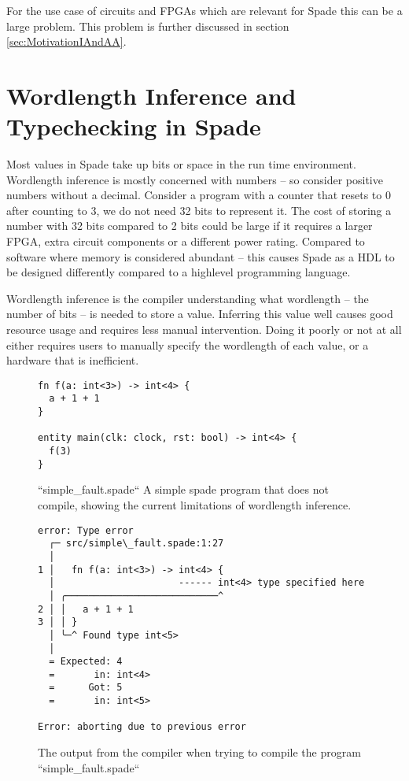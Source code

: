 For the use case of circuits and FPGAs which are relevant for Spade this can be a large problem. This problem is further discussed in section \ref{sec:MotivationIAndAA}.


\cite{src:affAri}

\section{Wordlength Inference and Typechecking in Spade}
\label{sec:TheProblem}
Most values in Spade take up bits or space in the run time environment. Wordlength inference is mostly concerned with numbers -- so consider positive numbers without a decimal. Consider a program with a counter that resets to 0 after counting to 3, we do not need 32 bits to represent it. The cost of storing a number with 32 bits compared to 2 bits could be large if it requires a larger FPGA, extra circuit components or a different power rating. Compared to software where memory is considered abundant -- this causes Spade as a HDL to be designed differently compared to a highlevel programming language.

Wordlength inference is the compiler understanding what wordlength -- the number of bits -- is needed to store a value. Inferring this value well causes good resource usage and requires less manual intervention. Doing it poorly or not at all either requires users to manually specify the wordlength of each value, or a hardware that is inefficient.

\begin{figure}[h]
\begin{center}
\begin{verbatim}
fn f(a: int<3>) -> int<4> {
  a + 1 + 1
}

entity main(clk: clock, rst: bool) -> int<4> {
  f(3)
}
\end{verbatim}
\end{center}
\label{fig:SimpleFaultSpade}
\caption{``simple\_fault.spade`` A simple spade program that does not compile, showing the current limitations of wordlength inference.}
\end{figure}

\begin{figure}[h]
\begin{center}
\begin{verbatim}
error: Type error
  ┌─ src/simple\_fault.spade:1:27
  │
1 │   fn f(a: int<3>) -> int<4> {
  │                      ------ int<4> type specified here
  │ ╭───────────────────────────^
2 │ │   a + 1 + 1
3 │ │ }
  │ ╰─^ Found type int<5>
  │
  = Expected: 4
  =       in: int<4>
  =      Got: 5
  =       in: int<5>

Error: aborting due to previous error
\end{verbatim}
\end{center}
\label{fig:SimpleFaultSpadeCompileOutput}
\caption{The output from the compiler when trying to compile the program ``simple\_fault.spade``}
\end{figure}

